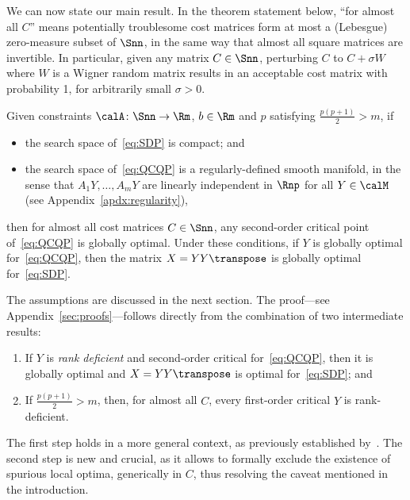 \documentclass{article}
\newcommand{\1}{\mathbf{1}}
\begin{document}
We can now state our main result. In the theorem statement below,
``for almost all $C$'' means potentially troublesome cost matrices form at most a (Lebesgue) zero-measure subset of $\Snn$, in the same way that almost all square matrices are invertible.
In particular, given any matrix $C\in\Snn$, perturbing $C$ to $C+\sigma W$ where $W$ is a Wigner random matrix results in an acceptable cost matrix with probability 1, for arbitrarily small $\sigma > 0$.
\begin{theorem}\label{thm:masterthm}
	Given constraints $\calA \colon \Snn \to \Rm$, $b\in\Rm$ and $p$ satisfying $\frac{p(p+1)}{2} > m$, if
	\begin{itemize}
		\item[(i)] the search space of~\eqref{eq:SDP} is compact; and
		\item[(ii)] the search space of~\eqref{eq:QCQP} is a regularly-defined smooth manifold, in the sense that $A_1Y, \ldots, A_mY$ are linearly independent in $\Rnp$ for all $Y \in \calM$ (see Appendix~\ref{apdx:regularity}),
	\end{itemize}
	then for almost all cost matrices $C\in\Snn$, any second-order critical point of~\eqref{eq:QCQP} is globally optimal. Under these conditions, if $Y$ is globally optimal for~\eqref{eq:QCQP}, then the matrix $X = YY\transpose$ is globally optimal for~\eqref{eq:SDP}. %
\end{theorem}
The assumptions are discussed in the next section. The proof---see Appendix~\ref{sec:proofs}---follows directly from the combination of two intermediate results:
\begin{enumerate}
	\item If $Y$ is \emph{rank deficient} and second-order critical for~\eqref{eq:QCQP}, then it is globally optimal and $X=YY\transpose$ is optimal for~\eqref{eq:SDP}; and
	\item If $\frac{p(p+1)}{2} > m$, then, for almost all $C$, every first-order critical $Y$ is rank-deficient.
\end{enumerate}
The first step holds in a more general context,
as previously established by~\citet{sdplr,burer2005local}. The second step is new and crucial, as it allows to formally exclude the existence of spurious local optima, generically in $C$, thus resolving the caveat mentioned in the introduction.
\end{document}
